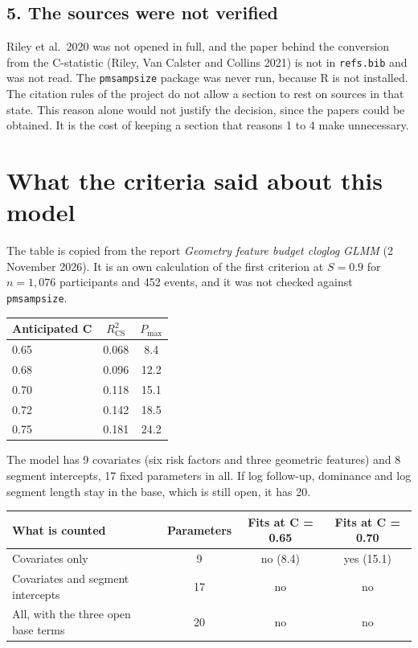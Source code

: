 \documentclass[11pt]{article}
\begin{document}
\subsection*{5. The sources were not verified}

Riley et al.\ 2020 was not opened in full, and the paper behind the conversion from the C-statistic
(Riley, Van Calster and Collins 2021) is not in \texttt{refs.bib} and was not read.
The \texttt{pmsampsize} package was never run, because R is not installed.
The citation rules of the project do not allow a section to rest on sources in that state.
This reason alone would not justify the decision, since the papers could be obtained.
It is the cost of keeping a section that reasons 1 to 4 make unnecessary.

\section{What the criteria said about this model}

The table is copied from the report \emph{Geometry feature budget cloglog GLMM} (2 November 2026).
It is an own calculation of the first criterion at $S = 0.9$ for $n = 1{,}076$ participants and 452
events, and it was not checked against \texttt{pmsampsize}.

\begin{center}
\begin{tabular}{@{}lcc@{}}
\toprule
Anticipated C & $R^2_{\mathrm{CS}}$ & $P_{\max}$ \\
\midrule
0.65 & 0.068 & 8.4 \\
0.68 & 0.096 & 12.2 \\
0.70 & 0.118 & 15.1 \\
0.72 & 0.142 & 18.5 \\
0.75 & 0.181 & 24.2 \\
\bottomrule
\end{tabular}
\end{center}

The model has 9 covariates (six risk factors and three geometric features) and 8 segment intercepts,
17 fixed parameters in all.
If log follow-up, dominance and log segment length stay in the base, which is still open, it has 20.

\begin{center}
\begin{tabular}{@{}lccc@{}}
\toprule
What is counted & Parameters & Fits at C = 0.65 & Fits at C = 0.70 \\
\midrule
Covariates only & 9 & no (8.4) & yes (15.1) \\
Covariates and segment intercepts & 17 & no & no \\
All, with the three open base terms & 20 & no & no \\
\bottomrule
\end{tabular}
\end{center}
\end{document}
